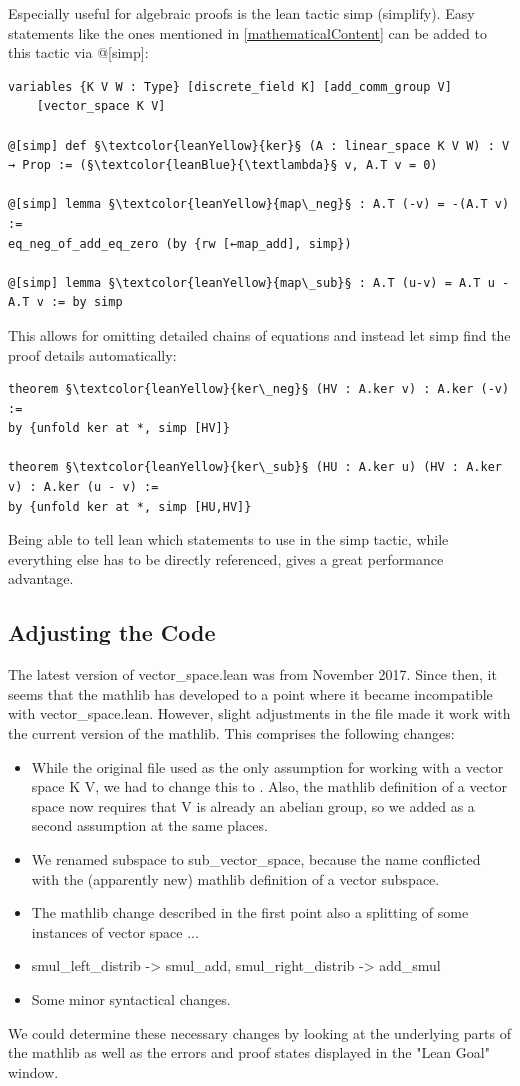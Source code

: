 \documentclass[11pt]{article}
\begin{document}
Especially useful for algebraic proofs is the lean tactic {\lean simp} (simplify). Easy statements like the ones mentioned in \ref{mathematicalContent} can be added to this tactic via {\lean @[simp]}:
\begin{lstlisting}
variables {K V W : Type} [discrete_field K] [add_comm_group V]
	[vector_space K V]

@[simp] def §\textcolor{leanYellow}{ker}§ (A : linear_space K V W) : V → Prop := (§\textcolor{leanBlue}{\textlambda}§ v, A.T v = 0)

@[simp] lemma §\textcolor{leanYellow}{map\_neg}§ : A.T (-v) = -(A.T v) :=
eq_neg_of_add_eq_zero (by {rw [←map_add], simp})

@[simp] lemma §\textcolor{leanYellow}{map\_sub}§ : A.T (u-v) = A.T u - A.T v := by simp
\end{lstlisting}
This allows for omitting detailed chains of equations and instead let {\lean simp} find the proof details automatically:
\begin{lstlisting}
theorem §\textcolor{leanYellow}{ker\_neg}§ (HV : A.ker v) : A.ker (-v) :=
by {unfold ker at *, simp [HV]}

theorem §\textcolor{leanYellow}{ker\_sub}§ (HU : A.ker u) (HV : A.ker v) : A.ker (u - v) :=
by {unfold ker at *, simp [HU,HV]}
\end{lstlisting}
Being able to tell lean which statements to use in the {\lean simp} tactic, while everything else has to be directly referenced, gives a great performance advantage.

\subsection{Adjusting the Code}
The latest version of vector\_space.lean was from November 2017. Since then, it seems that the mathlib has developed to a point where it became incompatible with vector\_space.lean.
However, slight adjustments in the file made it work with the current version of the mathlib. This comprises the following changes:
\begin{itemize}
\item While the original file used {\ftl [field K]} as the only assumption for working with a {\ftl vector space K V}, we had to change this to {}. Also, the mathlib definition of a vector space now requires that V is already an abelian group, so we added {} as a second assumption at the same places.
\item We renamed {\lean subspace} to {\lean sub\_vector\_space}, because the name conflicted with the (apparently new) mathlib definition of a vector subspace.
\item The mathlib change described in the first point also a splitting of some instances of vector space ...
\item smul\_left\_distrib -> smul\_add, smul\_right\_distrib -> add\_smul
\item Some minor syntactical changes.
\end{itemize}
We could determine these necessary changes by looking at the underlying parts of the mathlib as well as the errors and proof states displayed in the "Lean Goal" window.
\end{document}
